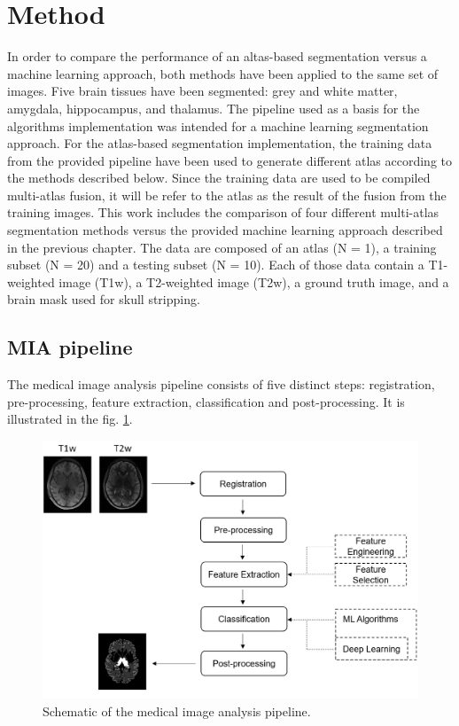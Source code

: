 \section*{Method}
In order to compare the performance of an altas-based segmentation versus a machine learning approach, both methods have been applied to the same set of images. Five brain tissues have been segmented: grey and white matter, amygdala, hippocampus, and thalamus. 
The pipeline used as a basis for the algorithms implementation was intended for a machine learning segmentation approach. For the atlas-based segmentation implementation, the training data from the provided pipeline have been used to generate different atlas according to the methods described below. Since the training data are used to be compiled multi-atlas fusion, it will be refer to the atlas as the result of the fusion from the training images. This work includes the comparison of four different multi-atlas segmentation methods versus the provided machine learning approach described in the previous chapter.
The data are composed of an atlas (N = 1), a training subset (N = 20) and a testing subset (N = 10). Each of those data contain a T1-weighted image (T1w), a T2-weighted image (T2w), a ground truth image, and a brain mask used for skull stripping.

\subsection*{MIA pipeline} \label{sec:MIApipeline}
The medical image analysis pipeline consists of five distinct steps: registration, pre-processing, feature extraction, classification and post-processing. It is illustrated in the fig. \ref{fig:pipeline}.

\begin{figure}[h!]
	\centering
	\includegraphics[width = .45 \textwidth]{img/pipeline2}
	\caption{Schematic of the medical image analysis pipeline.}
	\label{fig:pipeline}
\end{figure}

